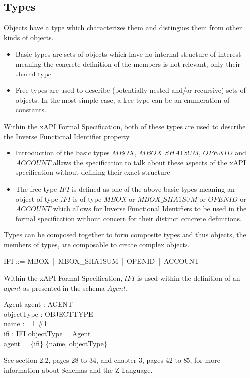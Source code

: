 \documentclass[../main.tex]{subfiles}
\begin{document}
\subsection{Types}
Objects have a type which characterizes them and distingues them from other kinds of objects.
\begin{itemize}
\item Basic types are sets of objects which have no internal structure of interest meaning the concrete definition of the members
  is not relevant, only their shared type.
\item Free types are used to describe (potentially nested and/or recursive) sets of objects. In the most simple case, a free type
  can be an enumeration of constants.
\end{itemize}
Within the xAPI Formal Specification, both of these types are used to describe the
\href{https://github.com/adlnet/xAPI-Spec/blob/master/xAPI-Data.md#inversefunctional}{Inverse Functional Identifier}
property.
\begin{itemize}
\item Introduction of the basic types $MBOX$, $MBOX\_SHA1SUM$, $OPENID$ and $ACCOUNT$
  allows the specification to talk about these aspects of the xAPI specification without
  defining their exact structure
\item The free type $IFI$ is defined as one of the above basic types meaning an object
  of type $IFI$ is of type $MBOX$ or $MBOX\_SHA1SUM$ or $OPENID$ or $ACCOUNT$
  which allows for Inverse Functional Identifiers to be used in the formal specification
  without concern for their distinct concrete definitions.
\end{itemize}
Types can be composed together to form composite types and thus objects, the members of types,
are composable to create complex objects.
\begin{zed}
  \also
  IFI ::= MBOX \,|\, MBOX\_SHA1SUM \,|\, OPENID \,|\, ACCOUNT
\end{zed}
Within the xAPI Formal Specification, $IFI$ is used within the definition
of an $agent$ as presented in the schema $Agent$.

\begin{schema}{Agent}
  agent : AGENT \\
  objectType : OBJECTTYPE \\
  name : \finset_1 \#1 \\
  ifi : IFI
  \where
  objectType = Agent \\
  agent = \{ifi\} \cup \power \{name, objectType\}
\end{schema}
See section 2.2, pages 28 to 34, and chapter 3, pages 42 to 85, for more information about Schemas and the Z Language.
\end{document}
